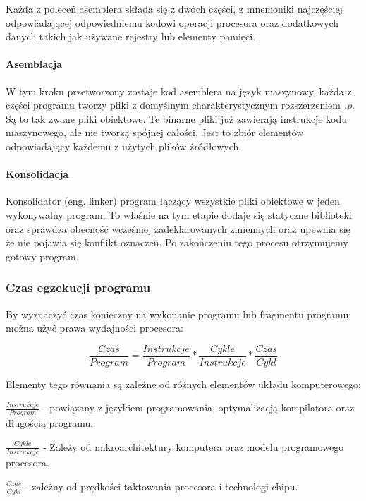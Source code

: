 Każda z poleceń asemblera składa się z dwóch części, z mnemoniki najczęściej odpowiadającej odpowiedniemu kodowi operacji procesora oraz dodatkowych danych takich jak używane rejestry lub elementy pamięci. 

\paragraph{Asemblacja}

W tym kroku przetworzony zostaje kod asemblera na język maszynowy, każda z części programu tworzy pliki z domyślnym charakterystycznym rozszerzeniem \textit{.o}.
Są to tak zwane pliki obiektowe.
Te binarne pliki już zawierają instrukcje kodu maszynowego, ale nie tworzą spójnej całości. Jest to zbiór elementów odpowiadający każdemu z użytych plików źródłowych.

\paragraph{Konsolidacja}
Konsolidator (eng. linker) program łączący wszystkie pliki obiektowe w jeden wykonywalny program. To właśnie na tym etapie dodaje się statyczne biblioteki oraz sprawdza obecność wcześniej zadeklarowanych zmiennych oraz upewnia się że nie pojawia się konflikt oznaczeń. Po zakończeniu tego procesu otrzymujemy gotowy program. 


\subsubsection{Czas egzekucji programu}

By wyznaczyć czas konieczny na wykonanie programu lub fragmentu programu można użyć prawa wydajności procesora\cite{arch}:

\begin{equation}
        \label{Iron Law}
        \frac{Czas}{Program} =  \frac{Instrukcje}{Program} * \frac{Cykle}{Instrukcje} * \frac{Czas}{Cykl}
\end{equation}

Elementy tego równania są zależne od różnych elementów układu komputerowego:
\begin{description}
        \item $\frac{Instrukcje}{Program}$ - powiązany z językiem programowania, optymalizacją kompilatora oraz długością programu. 
        \item $\frac{Cykle}{Instrukcje}$ - Zależy od mikroarchitektury komputera oraz modelu programowego procesora.
        \item $\frac{Czas}{Cykl}$ -  zależny od prędkości taktowania procesora i technologi chipu. 
\end{description} 


